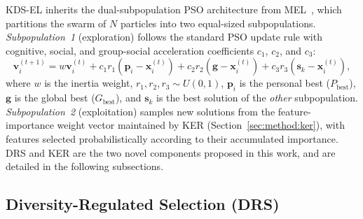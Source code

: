 \documentclass[a4paper,fleqn]{cas-dc}
\begin{document}
\begin{sloppypar}
	\par{
	KDS-EL inherits the dual-subpopulation PSO architecture from
	MEL~\citep{MEL_CITE}, which partitions the swarm of $N$ particles
	into two equal-sized subpopulations.
	\textit{Subpopulation~1} (exploration) follows the standard PSO
	update rule with cognitive, social, and group-social acceleration
	coefficients $c_1$, $c_2$, and $c_3$:
	\begin{equation}
		\mathbf{v}_i^{(t+1)} = w \mathbf{v}_i^{(t)}
		+ c_1 r_1 (\mathbf{p}_i - \mathbf{x}_i^{(t)})
		+ c_2 r_2 (\mathbf{g} - \mathbf{x}_i^{(t)})
		+ c_3 r_3 (\mathbf{s}_k - \mathbf{x}_i^{(t)}),
		\label{eq:pso_update}
	\end{equation}
	where $w$ is the inertia weight, $r_1, r_2, r_3 \sim U(0,1)$,
	$\mathbf{p}_i$ is the personal best ($P_{\mathrm{best}}$),
	$\mathbf{g}$ is the global best ($G_{\mathrm{best}}$), and
	$\mathbf{s}_k$ is the best solution of the \emph{other} subpopulation.
	\textit{Subpopulation~2} (exploitation) samples new solutions from
	the feature-importance weight vector maintained by KER
	(Section~\ref{sec:method:ker}), with features selected
	probabilistically according to their accumulated importance.
	DRS and KER are the two novel components proposed in this work,
	and are detailed in the following subsections.
	}

	\subsection{Diversity-Regulated Selection (DRS)}
	\label{sec:method:drs}


\end{sloppypar}
\end{document}

